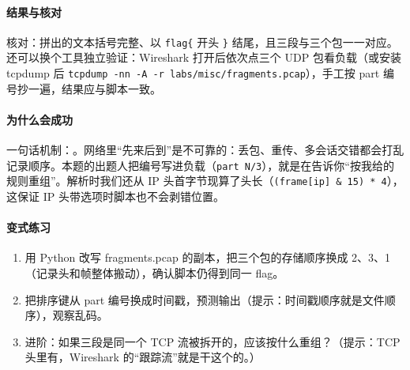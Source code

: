 \documentclass[UTF8,12pt,oneside]{ctexbook}
\begin{document}
\paragraph{结果与核对}
核对：拼出的文本括号完整、以 \verb|flag{| 开头 \verb|}| 结尾，且三段与三个包一一对应。还可以换个工具独立验证：Wireshark 打开后依次点三个 UDP 包看负载（或安装 tcpdump 后 \verb|tcpdump -nn -A -r labs/misc/fragments.pcap|），手工按 part 编号抄一遍，结果应与脚本一致。

\paragraph{为什么会成功}
一句话机制：。网络里“先来后到”是不可靠的：丢包、重传、多会话交错都会打乱记录顺序。本题的出题人把编号写进负载（\verb|part N/3|），就是在告诉你“按我给的规则重组”。解析时我们还从 IP 头首字节现算了头长（\verb|(frame[ip] & 15) * 4|），这保证 IP 头带选项时脚本也不会剥错位置。


\paragraph{变式练习}
\begin{enumerate}[label=\alph*.]
\item 用 Python 改写 fragments.pcap 的副本，把三个包的存储顺序换成 2、3、1（记录头和帧整体搬动），确认脚本仍得到同一 flag。
\item 把排序键从 part 编号换成时间戳，预测输出（提示：时间戳顺序就是文件顺序），观察乱码。
\item 进阶：如果三段是同一个 TCP 流被拆开的，应该按什么重组？（提示：TCP 头里有，Wireshark 的“跟踪流”就是干这个的。）
\end{enumerate}
\end{document}
